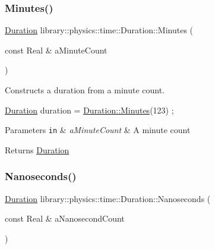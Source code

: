 \subsubsection{\texorpdfstring{Minutes()}{Minutes()}}
{\footnotesize\ttfamily \hyperlink{classlibrary_1_1physics_1_1time_1_1_duration}{Duration} library\+::physics\+::time\+::\+Duration\+::\+Minutes (\begin{DoxyParamCaption}\item[{const Real \&}]{a\+Minute\+Count }\end{DoxyParamCaption})\hspace{0.3cm}{\ttfamily [static]}}



Constructs a duration from a minute count. 


\begin{DoxyCode}
\hyperlink{classlibrary_1_1physics_1_1time_1_1_duration_a0a70efcf487a841da572afcf00001f64}{Duration} duration = \hyperlink{classlibrary_1_1physics_1_1time_1_1_duration_ad7171befa3075e796bfb02a7542dacdd}{Duration::Minutes}(123) ;
\end{DoxyCode}



\begin{DoxyParams}[1]{Parameters}
\mbox{\tt in}  & {\em a\+Minute\+Count} & A minute count \\
\hline
\end{DoxyParams}
\begin{DoxyReturn}{Returns}
\hyperlink{classlibrary_1_1physics_1_1time_1_1_duration}{Duration} 
\end{DoxyReturn}
\mbox{\label{classlibrary_1_1physics_1_1time_1_1_duration_a6a629b2275337fbadac912cc9364a9f1}} 
\subsubsection{\texorpdfstring{Nanoseconds()}{Nanoseconds()}}
{\footnotesize\ttfamily \hyperlink{classlibrary_1_1physics_1_1time_1_1_duration}{Duration} library\+::physics\+::time\+::\+Duration\+::\+Nanoseconds (\begin{DoxyParamCaption}\item[{const Real \&}]{a\+Nanosecond\+Count }\end{DoxyParamCaption})\hspace{0.3cm}{\ttfamily [static]}}



